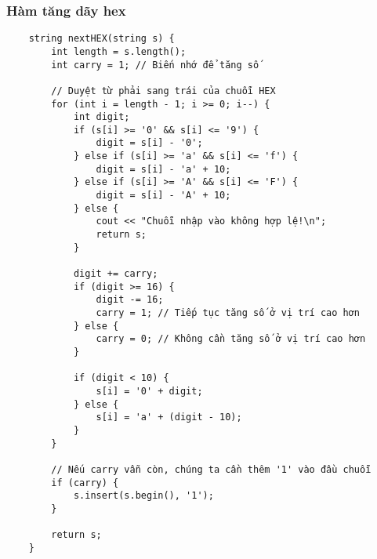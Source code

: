 \subsubsection{Hàm tăng dãy hex}
\begin{verbatim}
	string nextHEX(string s) {
		int length = s.length();
		int carry = 1; // Biến nhớ để tăng số
		
		// Duyệt từ phải sang trái của chuỗi HEX
		for (int i = length - 1; i >= 0; i--) {
			int digit;
			if (s[i] >= '0' && s[i] <= '9') {
				digit = s[i] - '0';
			} else if (s[i] >= 'a' && s[i] <= 'f') {
				digit = s[i] - 'a' + 10;
			} else if (s[i] >= 'A' && s[i] <= 'F') {
				digit = s[i] - 'A' + 10;
			} else {
				cout << "Chuỗi nhập vào không hợp lệ!\n";
				return s;
			}
			
			digit += carry;
			if (digit >= 16) {
				digit -= 16;
				carry = 1; // Tiếp tục tăng số ở vị trí cao hơn
			} else {
				carry = 0; // Không cần tăng số ở vị trí cao hơn
			}
			
			if (digit < 10) {
				s[i] = '0' + digit;
			} else {
				s[i] = 'a' + (digit - 10);
			}
		}
		
		// Nếu carry vẫn còn, chúng ta cần thêm '1' vào đầu chuỗi
		if (carry) {
			s.insert(s.begin(), '1');
		}
		
		return s;
	}
\end{verbatim}
